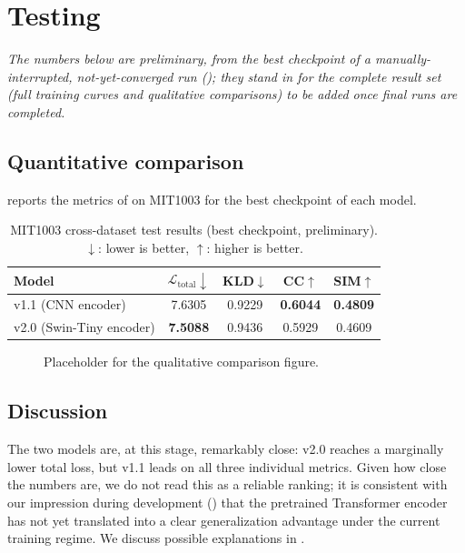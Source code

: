 
\section{Testing}
\label{sec:testing}

\noindent\textit{The numbers below are preliminary, from the best checkpoint of a manually-interrupted, not-yet-converged run (); they stand in for the complete result set (full training curves and qualitative comparisons) to be added once final runs are completed.}

\subsection{Quantitative comparison}
\label{subsec:quant}

 reports the metrics of  on MIT1003 for the best checkpoint of each model.

\begin{table}[t]
\centering
\caption{MIT1003 cross-dataset test results (best checkpoint, preliminary). $\downarrow$: lower is better, $\uparrow$: higher is better.}
\label{tab:results}
\begin{tabular}{@{}lcccc@{}}
\toprule
\textbf{Model} & $\mathcal{L}_{\mathrm{total}}\downarrow$ & KLD$\downarrow$ & CC$\uparrow$ & SIM$\uparrow$ \\
\midrule
v1.1 (CNN encoder)         & 7.6305 & 0.9229 & \textbf{0.6044} & \textbf{0.4809} \\
v2.0 (Swin-Tiny encoder)   & \textbf{7.5088} & 0.9436 & 0.5929 & 0.4609 \\
\bottomrule
\end{tabular}
\end{table}

\begin{figure}[t]
\centering
{}
\caption{Placeholder for the qualitative comparison figure.}
\label{fig:qual-placeholder}
\end{figure}

\subsection{Discussion}
\label{subsec:testdiscuss}

The two models are, at this stage, remarkably close: v2.0 reaches a marginally lower total loss, but v1.1 leads on all three individual metrics. Given how close the numbers are, we do not read this as a reliable ranking; it is consistent with our impression during development () that the pretrained Transformer encoder has not yet translated into a clear generalization advantage under the current training regime. We discuss possible explanations in .
